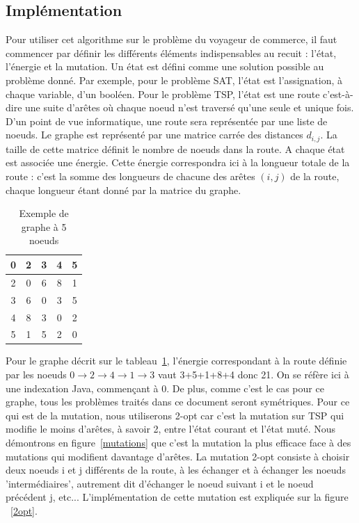 \documentclass{article}%
\begin{document}
\subsection{Implémentation}

\vspace{1cm}

	Pour utiliser cet algorithme sur le problème du voyageur de commerce, il faut commencer par définir les différents éléments indispensables au recuit : l'état, l'énergie et la mutation.
	Un état est défini comme une solution possible au problème donné. Par exemple, pour le problème SAT, l'état est l'assignation, à chaque variable, d'un booléen. Pour le problème TSP, l'état est une route c'est-à-dire une suite d'arêtes où chaque noeud n'est traversé qu'une seule et unique fois. D'un point de vue informatique, une route sera représentée par une liste de noeuds. Le graphe est représenté par une matrice carrée des distances $ d_{i,j} $. La taille de cette matrice définit le nombre de noeuds dans la route. A chaque état est associée une énergie. Cette énergie correspondra ici à la longueur totale de la route : c'est la somme des longueurs de chacune des arêtes $ (i,j) $ de la route, chaque longueur étant donné par la matrice du graphe.
	
	
	\begin{table}[hp]
		\centering
			\begin{tabular}{|*{5}{c|}}
					\hline
					0  & 2  & 3 & 4 & 5 \\
					\hline
					2  & 0 & 6 & 8 & 1 \\
					\hline
					3  & 6 & 0 & 3 & 5 \\
					\hline
					4  & 8 & 3 & 0 & 2 \\
					\hline
					5  & 1 & 5 & 2 & 0 \\
					\hline
			\end{tabular}
		\label{tableau_distances}
		\caption{Exemple de graphe à 5 noeuds}
	\end{table}

Pour le graphe décrit sur le tableau~\ref{tableau_distances}, l'énergie correspondant à la route définie par les noeuds $ 0\rightarrow 2\rightarrow 4\rightarrow 1\rightarrow 3 $ vaut 3+5+1+8+4 donc 21. On se réfère ici à une indexation Java, commençant à 0. De plus, comme c'est le cas pour ce graphe, tous les problèmes traités dans ce document seront symétriques.
	Pour ce qui est de la mutation, nous utiliserons 2-opt car c'est la mutation sur TSP qui modifie le moins d'arêtes, à savoir 2, entre l'état courant et l'état muté. Nous démontrons en figure~\ref{mutations} que c'est la mutation la plus efficace face à des mutations qui modifient davantage d'arêtes.
		La mutation 2-opt consiste à choisir deux noeuds i et j différents de la route, à les échanger et à échanger les noeuds 'intermédiaires', autrement dit d'échanger le noeud suivant i et le noeud précédent j, etc... L'implémentation de cette mutation est expliquée sur la figure ~\ref{2opt}.
	
\end{document}
